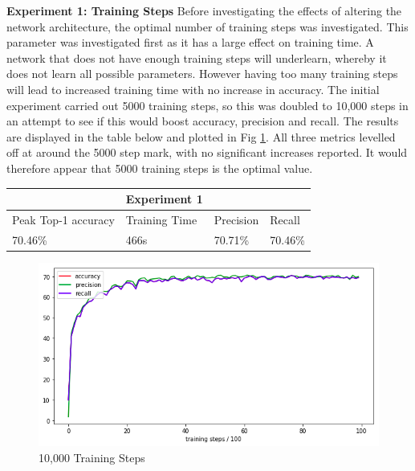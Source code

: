 \documentclass[12pt]{report}
\begin{document}
\begin{flushleft}
\vspace{0.5cm}
\textbf{Experiment 1: Training Steps}
\linebreak
Before investigating the effects of altering the network architecture, the optimal number of training steps was investigated. This parameter was investigated first as it has a large effect on training time. A network that does not have enough training steps will underlearn, whereby it does not learn all possible parameters. However having too many training steps will lead to increased training time with no increase in accuracy. The initial experiment carried out 5000 training steps, so this was doubled to 10,000 steps in an attempt to see if this would boost accuracy, precision and recall. The results are displayed in the table below and plotted in Fig \ref{fig:experiment-1}. All three metrics levelled off at around the 5000 step mark, with no significant increases reported. It would therefore appear that 5000 training steps is the optimal value.

\vspace{0.5cm}
\begin{tabular}{llll}
                                           & Experiment 1                       &                                                             \\ \hline
\multicolumn{1}{|l|}{Peak Top-1 accuracy} & \multicolumn{1}{l|}{Training Time} & \multicolumn{1}{l|}{Precision} & \multicolumn{1}{l|}{Recall}  \\ \hline
\multicolumn{1}{|l|}{70.46\%}             & \multicolumn{1}{l|}{466s}          & \multicolumn{1}{l|}{70.71\%}   & \multicolumn{1}{l|}{70.46\%} \\ \hline
\end{tabular}

\vspace{0.5cm}
\begin{figure}[ht!]
	\centering
	\includegraphics[width=12cm]{experiment-1}
	\caption{10,000 Training Steps}
	\label{fig:experiment-1}
\end{figure}
\end{flushleft}
\end{document}
